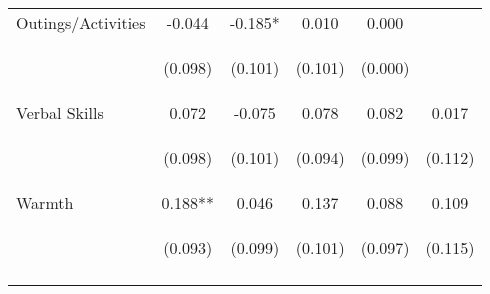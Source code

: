 \begin{tabular}{lccccc}
\noalign{\smallskip}Outings/Activities & -0.044 & -0.185* & 0.010 & 0.000 & \\
 & \begin{footnotesize}(0.098)\end{footnotesize} & \begin{footnotesize}(0.101)\end{footnotesize} & \begin{footnotesize}(0.101)\end{footnotesize} & \begin{footnotesize}(0.000)\end{footnotesize} & \begin{footnotesize}\end{footnotesize}\\
\noalign{\smallskip}Verbal Skills & 0.072 & -0.075 & 0.078 & 0.082 & 0.017\\
 & \begin{footnotesize}(0.098)\end{footnotesize} & \begin{footnotesize}(0.101)\end{footnotesize} & \begin{footnotesize}(0.094)\end{footnotesize} & \begin{footnotesize}(0.099)\end{footnotesize} & \begin{footnotesize}(0.112)\end{footnotesize}\\
\noalign{\smallskip}Warmth & 0.188** & 0.046 & 0.137 & 0.088 & 0.109\\
 & \begin{footnotesize}(0.093)\end{footnotesize} & \begin{footnotesize}(0.099)\end{footnotesize} & \begin{footnotesize}(0.101)\end{footnotesize} & \begin{footnotesize}(0.097)\end{footnotesize} & \begin{footnotesize}(0.115)\end{footnotesize}\\
\noalign{\smallskip}\hline\end{tabular}\\
